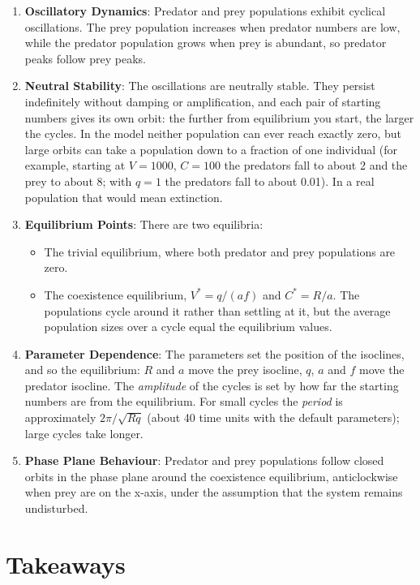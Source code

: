 \documentclass[
  a4paper]{book}
\providecommand{\tightlist}{%
  \setlength{\itemsep}{0pt}\setlength{\parskip}{0pt}}
\begin{document}
\begin{enumerate}
\def\labelenumi{\arabic{enumi}.}
\item
  \textbf{Oscillatory Dynamics}: Predator and prey populations exhibit cyclical oscillations. The prey population increases when predator numbers are low, while the predator population grows when prey is abundant, so predator peaks follow prey peaks.
\item
  \textbf{Neutral Stability}: The oscillations are neutrally stable. They persist indefinitely without damping or amplification, and each pair of starting numbers gives its own orbit: the further from equilibrium you start, the larger the cycles. In the model neither population can ever reach exactly zero, but large orbits can take a population down to a fraction of one individual (for example, starting at \(V = 1000\), \(C = 100\) the predators fall to about 2 and the prey to about 8; with \(q = 1\) the predators fall to about 0.01). In a real population that would mean extinction.
\item
  \textbf{Equilibrium Points}: There are two equilibria:

  \begin{itemize}
  \tightlist
  \item
    The trivial equilibrium, where both predator and prey populations are zero.
  \item
    The coexistence equilibrium, \(V^* = q/(af)\) and \(C^* = R/a\). The populations cycle around it rather than settling at it, but the average population sizes over a cycle equal the equilibrium values.
  \end{itemize}
\item
  \textbf{Parameter Dependence}: The parameters set the position of the isoclines, and so the equilibrium: \(R\) and \(a\) move the prey isocline, \(q\), \(a\) and \(f\) move the predator isocline. The \emph{amplitude} of the cycles is set by how far the starting numbers are from the equilibrium. For small cycles the \emph{period} is approximately \(2\pi/\sqrt{Rq}\) (about 40 time units with the default parameters); large cycles take longer.
\item
  \textbf{Phase Plane Behaviour}: Predator and prey populations follow closed orbits in the phase plane around the coexistence equilibrium, anticlockwise when prey are on the x-axis, under the assumption that the system remains undisturbed.
\end{enumerate}

\section{Takeaways}\label{takeaways-21}
\end{document}
